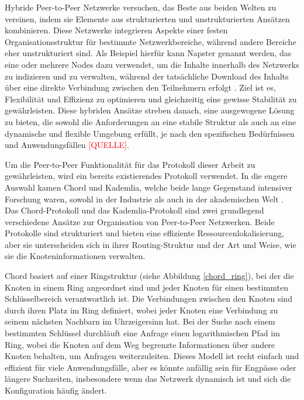 Hybride Peer-to-Peer Netzwerke versuchen, das Beste aus beiden Welten zu vereinen, indem sie Elemente aus strukturierten und unstrukturierten Ansätzen kombinieren. Diese Netzwerke integrieren Aspekte einer festen Organisationsstruktur für bestimmte Netzwerkbereiche, während andere Bereiche eher unstrukturiert sind. Als Beispiel hierfür kann Napster genannt werden, das eine oder mehrere Nodes dazu verwendet, um die Inhalte innerhalb des Netzwerks zu indizieren und zu verwalten, während der tatsächliche Download des Inhalts über eine direkte Verbindung zwischen den Teilnehmern erfolgt \parencite{Yang_ComparingHybridP2PSystems}.
Ziel ist es, Flexibilität und Effizienz zu optimieren und gleichzeitig eine gewisse Stabilität zu gewährleisten. Diese hybriden Ansätze streben danach, eine ausgewogene Lösung zu bieten, die sowohl die Anforderungen an eine stabile Struktur als auch an eine dynamische und flexible Umgebung erfüllt, je nach den spezifischen Bedürfnissen und Anwendungsfällen \textcolor{red}{[QUELLE]}.

Um die Peer-to-Peer Funktionalität für das Protokoll dieser Arbeit zu gewährleisten, wird ein bereits existierendes Protokoll verwendet. In die engere Auswahl kamen Chord und Kademlia, welche beide lange Gegenstand intensiver Forschung waren, sowohl in der Industrie als auch in der akademischen Welt \parencite[S. 808]{MedranoChavez_ChordKademliaHighChurnScenarios}. 
Das Chord-Protokoll und das Kademlia-Protokoll sind zwei grundlegend verschiedene Ansätze zur Organisation von Peer-to-Peer Netzwerken. Beide Protokolle sind strukturiert und bieten eine effiziente Ressourcenlokalisierung, aber sie unterscheiden sich in ihrer Routing-Struktur und der Art und Weise, wie sie die Knoteninformationen verwalten.

Chord basiert auf einer Ringstruktur (siehe Abbildung \ref{chord_ring}), bei der die Knoten in einem Ring angeordnet sind und jeder Knoten für einen bestimmten Schlüsselbereich verantwortlich ist. Die Verbindungen zwischen den Knoten sind durch ihren Platz im Ring definiert, wobei jeder Knoten eine Verbindung zu seinem nächsten Nachbarn im Uhrzeigersinn hat. Bei der Suche nach einem bestimmten Schlüssel durchläuft eine Anfrage einen logarithmischen Pfad im Ring, wobei die Knoten auf dem Weg begrenzte Informationen über andere Knoten behalten, um Anfragen weiterzuleiten. Dieses Modell ist recht einfach und effizient für viele Anwendungsfälle, aber es könnte anfällig sein für Engpässe oder längere Suchzeiten, insbesondere wenn das Netzwerk dynamisch ist und sich die Konfiguration häufig ändert.

